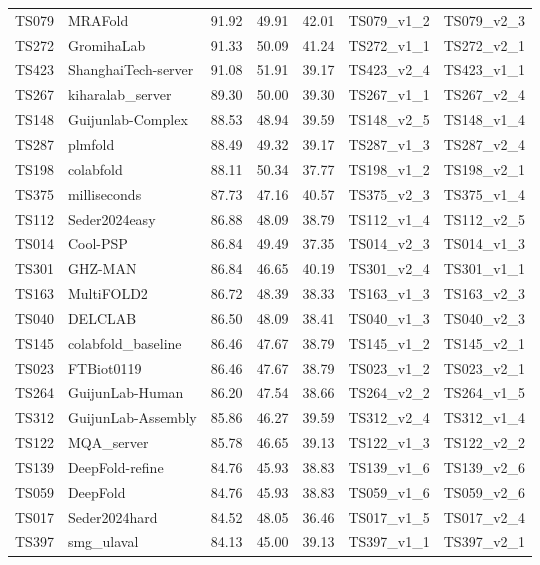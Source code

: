 \begin{longtable}{lllllll}
TS079 & MRAFold & 91.92 & 49.91 & 42.01 & TS079\_v1\_2 & TS079\_v2\_3 \\ 
TS272 & GromihaLab & 91.33 & 50.09 & 41.24 & TS272\_v1\_1 & TS272\_v2\_1 \\ 
TS423 & ShanghaiTech-server & 91.08 & 51.91 & 39.17 & TS423\_v2\_4 & TS423\_v1\_1 \\ 
TS267 & kiharalab\_server & 89.30 & 50.00 & 39.30 & TS267\_v1\_1 & TS267\_v2\_4 \\ 
TS148 & Guijunlab-Complex & 88.53 & 48.94 & 39.59 & TS148\_v2\_5 & TS148\_v1\_4 \\ 
TS287 & plmfold & 88.49 & 49.32 & 39.17 & TS287\_v1\_3 & TS287\_v2\_4 \\ 
TS198 & colabfold & 88.11 & 50.34 & 37.77 & TS198\_v1\_2 & TS198\_v2\_1 \\ 
TS375 & milliseconds & 87.73 & 47.16 & 40.57 & TS375\_v2\_3 & TS375\_v1\_4 \\ 
TS112 & Seder2024easy & 86.88 & 48.09 & 38.79 & TS112\_v1\_4 & TS112\_v2\_5 \\ 
TS014 & Cool-PSP & 86.84 & 49.49 & 37.35 & TS014\_v2\_3 & TS014\_v1\_3 \\ 
TS301 & GHZ-MAN & 86.84 & 46.65 & 40.19 & TS301\_v2\_4 & TS301\_v1\_1 \\ 
TS163 & MultiFOLD2 & 86.72 & 48.39 & 38.33 & TS163\_v1\_3 & TS163\_v2\_3 \\ 
TS040 & DELCLAB & 86.50 & 48.09 & 38.41 & TS040\_v1\_3 & TS040\_v2\_3 \\ 
TS145 & colabfold\_baseline & 86.46 & 47.67 & 38.79 & TS145\_v1\_2 & TS145\_v2\_1 \\ 
TS023 & FTBiot0119 & 86.46 & 47.67 & 38.79 & TS023\_v1\_2 & TS023\_v2\_1 \\ 
TS264 & GuijunLab-Human & 86.20 & 47.54 & 38.66 & TS264\_v2\_2 & TS264\_v1\_5 \\ 
TS312 & GuijunLab-Assembly & 85.86 & 46.27 & 39.59 & TS312\_v2\_4 & TS312\_v1\_4 \\ 
TS122 & MQA\_server & 85.78 & 46.65 & 39.13 & TS122\_v1\_3 & TS122\_v2\_2 \\ 
TS139 & DeepFold-refine & 84.76 & 45.93 & 38.83 & TS139\_v1\_6 & TS139\_v2\_6 \\ 
TS059 & DeepFold & 84.76 & 45.93 & 38.83 & TS059\_v1\_6 & TS059\_v2\_6 \\ 
TS017 & Seder2024hard & 84.52 & 48.05 & 36.46 & TS017\_v1\_5 & TS017\_v2\_4 \\ 
TS397 & smg\_ulaval & 84.13 & 45.00 & 39.13 & TS397\_v1\_1 & TS397\_v2\_1 \\ 

\end{longtable}
